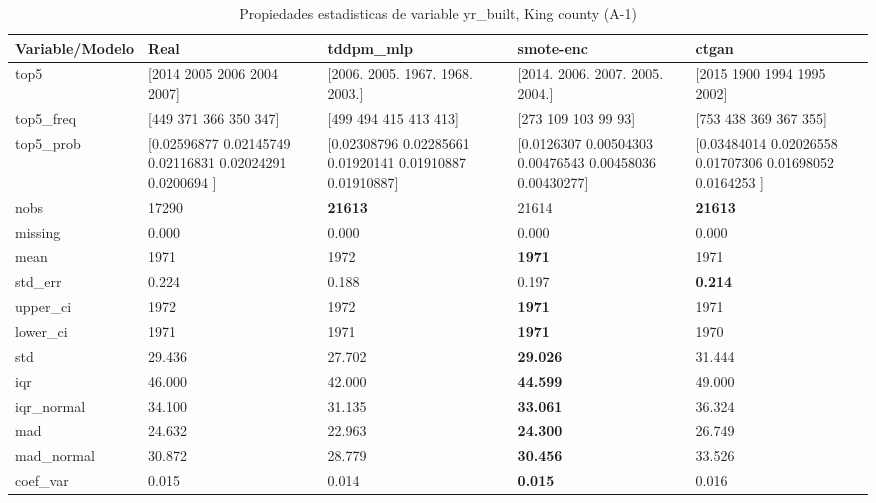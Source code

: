 \begin{table}[H]
\centering
\fontsize{8}{14}\selectfont
\caption{Propiedades  estadisticas de variable yr\_built, King county (A-1)}
\label{table-stats-king county-a-1-yr_built}
\begin{tabular}{|l|m{10em}|m{10em}|m{10em}|m{10em}|}
\hline
 \rowcolor[gray]{0.8}
Variable/Modelo & Real & tddpm\_mlp & smote-enc & ctgan \\
\hline top5 & [2014 2005 2006 2004 2007] & [2006. 2005. 1967. 1968. 2003.] & [2014. 2006. 2007. 2005. 2004.] & [2015 1900 1994 1995 2002] \\
\hline top5\_freq & [449 371 366 350 347] & [499 494 415 413 413] & [273 109 103  99  93] & [753 438 369 367 355] \\
\hline top5\_prob & [0.02596877 0.02145749 0.02116831 0.02024291 0.0200694 ] & [0.02308796 0.02285661 0.01920141 0.01910887 0.01910887] & [0.0126307  0.00504303 0.00476543 0.00458036 0.00430277] & [0.03484014 0.02026558 0.01707306 0.01698052 0.0164253 ] \\
\hline nobs & 17290 & \bfseries 21613 & \cellcolor[rgb]{0.9, 0.54, 0.52} 21614 & \bfseries 21613 \\
\hline missing & 0.000 & 0.000 & 0.000 & 0.000 \\
\hline mean & 1971 & \cellcolor[rgb]{0.9, 0.54, 0.52} 1972 & \bfseries 1971 & 1971 \\
\hline std\_err & 0.224 & \cellcolor[rgb]{0.9, 0.54, 0.52} 0.188 & 0.197 & \bfseries 0.214 \\
\hline upper\_ci & 1972 & \cellcolor[rgb]{0.9, 0.54, 0.52} 1972 & \bfseries 1971 & 1971 \\
\hline lower\_ci & 1971 & \cellcolor[rgb]{0.9, 0.54, 0.52} 1971 & \bfseries 1971 & 1970 \\
\hline std & 29.436 & 27.702 & \bfseries 29.026 & \cellcolor[rgb]{0.9, 0.54, 0.52} 31.444 \\
\hline iqr & 46.000 & \cellcolor[rgb]{0.9, 0.54, 0.52} 42.000 & \bfseries 44.599 & 49.000 \\
\hline iqr\_normal & 34.100 & \cellcolor[rgb]{0.9, 0.54, 0.52} 31.135 & \bfseries 33.061 & 36.324 \\
\hline mad & 24.632 & 22.963 & \bfseries 24.300 & \cellcolor[rgb]{0.9, 0.54, 0.52} 26.749 \\
\hline mad\_normal & 30.872 & 28.779 & \bfseries 30.456 & \cellcolor[rgb]{0.9, 0.54, 0.52} 33.526 \\
\hline coef\_var & 0.015 & 0.014 & \bfseries 0.015 & \cellcolor[rgb]{0.9, 0.54, 0.52} 0.016 \\

\end{tabular}
\end{table}
